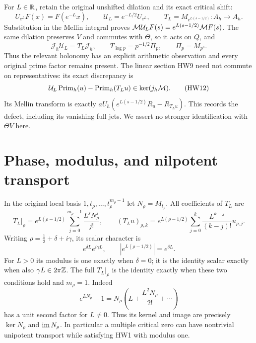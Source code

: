 For \(L\in\mathbb R\), retain the original unshifted dilation and its
exact critical shift:
\[
 U_{e^L}F(x)=F(e^{-L}x),\qquad
 \mathcal U_L=e^{-L/2}U_{e^L},\qquad
 T_L=M_{e^{L(s-1/2)}}:A_h\longrightarrow A_h.
 \tag{HW10}
\]
Substitution in the Mellin integral proves
\(\mathcal M\mathcal U_LF(s)=e^{L(s-1/2)}\mathcal M F(s)\).
The same dilation preserves \(V\) and commutes with \(\Theta\),
so it acts on \(Q\), and
\[
 \mathcal J_h\mathcal U_L=T_L\mathcal J_h,\qquad
 T_{\log p}=p^{-1/2}\Pi_p,\qquad \Pi_p=M_{p^s}.
 \tag{HW11}\label{hw:intertwine}
\]
Thus the relevant holonomy has an explicit arithmetic observation
and every original prime factor remains present. The linear section
HW9 need not commute on representatives: its exact discrepancy is
\[
 \mathcal U_L\operatorname{Prim}_h(u)
       -\operatorname{Prim}_h(T_Lu)\in\ker(j_h\mathcal M).
 \tag{HW12}
\]
Its Mellin transform is exactly
\(aU_h(e^{L(s-1/2)}R_u-R_{T_Lu})\).
This records the defect, including its vanishing full jets.
We assert no stronger identification with \(\Theta V\) here.

\section{Phase, modulus, and nilpotent transport}

In the original local basis \(1,t_\rho,\ldots,t_\rho^{m_\rho-1}\)
let \(N_\rho=M_{t_\rho}\). All coefficients of \(T_L\) are
\[
 T_L|_\rho
 =e^{L(\rho-1/2)}
       \sum_{j=0}^{m_\rho-1}\frac{L^jN_\rho^j}{j!},\qquad
 (T_Lu)_{\rho,k}
 =e^{L(\rho-1/2)}
       \sum_{j=0}^k\frac{L^{k-j}}{(k-j)!}u_{\rho,j}.
 \tag{HW13}\label{hw:fullmonodromy}
\]
Writing \(\rho=\tfrac12+\delta+i\gamma\), its scalar character is
\[
 e^{\delta L}e^{i\gamma L},\qquad
 \left|e^{L(\rho-1/2)}\right|=e^{\delta L}.
 \tag{HW14}
\]
For \(L>0\) its modulus is one exactly when \(\delta=0\);
it is the identity scalar exactly when also
\(\gamma L\in2\pi\mathbb Z\). The full \(T_L|_\rho\) is the identity
exactly when these two conditions hold and \(m_\rho=1\).
Indeed
\[
 e^{LN_\rho}-1=N_\rho
  \left(L+\frac{L^2N_\rho}{2!}+\cdots\right)
 \tag{HW15}
\]
has a unit second factor for \(L\ne0\). Thus its kernel and image
are precisely \(\ker N_\rho\) and \(\operatorname{im} N_\rho\).
In particular a multiple critical zero can have nontrivial
unipotent transport while satisfying HW1 with modulus one.


